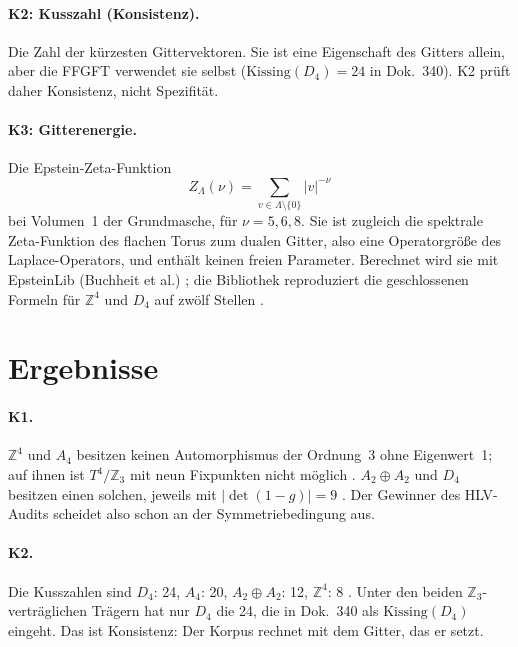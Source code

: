 \paragraph{K2: Kusszahl (Konsistenz).}
Die Zahl der kürzesten Gittervektoren. Sie ist eine Eigenschaft des Gitters
allein, aber die FFGFT verwendet sie selbst ($\mathrm{Kissing}(D_4)=24$ in
Dok.~340). K2 prüft daher Konsistenz, nicht Spezifität.

\paragraph{K3: Gitterenergie.}
Die Epstein-Zeta-Funktion
\begin{equation}
Z_\Lambda(\nu)=\sum_{v\in\Lambda\setminus\{0\}}|v|^{-\nu}
\end{equation}
bei Volumen~1 der Grundmasche, für $\nu=5,6,8$. Sie ist zugleich die
spektrale Zeta-Funktion des flachen Torus zum dualen Gitter, also eine
Operatorgröße des Laplace-Operators, und enthält keinen freien Parameter.
Berechnet wird sie mit EpsteinLib (Buchheit et al.) \QM; die Bibliothek
reproduziert die geschlossenen Formeln für $\mathbb{Z}^4$ und $D_4$ auf zwölf
Stellen \KM.

\section{Ergebnisse}

\paragraph{K1.}
$\mathbb{Z}^4$ und $A_4$ besitzen keinen Automorphismus der Ordnung~3 ohne
Eigenwert~1; auf ihnen ist $T^4/\mathbb{Z}_3$ mit neun Fixpunkten nicht
möglich \KM. $A_2\oplus A_2$ und $D_4$ besitzen einen solchen, jeweils mit
$|\det(1-g)|=9$ \KM. Der Gewinner des HLV-Audits scheidet also schon an der
Symmetriebedingung aus.

\paragraph{K2.}
Die Kusszahlen sind $D_4$: 24, $A_4$: 20, $A_2\oplus A_2$: 12,
$\mathbb{Z}^4$: 8 \KM. Unter den beiden $\mathbb{Z}_3$-verträglichen Trägern
hat nur $D_4$ die 24, die in Dok.~340 als $\mathrm{Kissing}(D_4)$ eingeht.
Das ist Konsistenz: Der Korpus rechnet mit dem Gitter, das er setzt.

